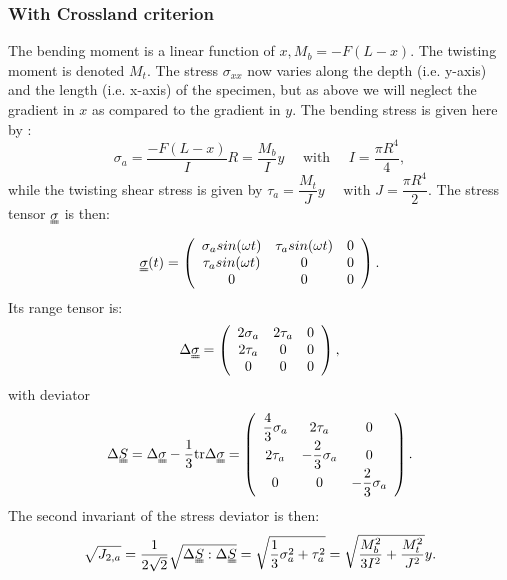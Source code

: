 \subsubsection{With Crossland criterion}
The bending moment is a linear function of $x, M_b= -F(L-x)$. The twisting moment is denoted $M_t$. The stress $\sigma_{xx}$ now varies along the depth (i.e. y-axis) and the length (i.e. x-axis) of the specimen, but as above we will neglect the gradient in $x$ as compared to the gradient in $y$. The bending stress is given here by : 
\begin{equation}
	\sigma_{a}=\dfrac{-F(L-x)}{I}R=\dfrac{M_b}{I}y \quad \text{ with } \quad I=\dfrac{\pi R^4}{4},
\end{equation}
while the twisting shear stress is given by 
$ \tau_{a}=\dfrac{M_t}{J}y \quad \text{ with  }
J=\dfrac{\pi R^4}{2}$. 
The stress tensor $\uuline{\sigma}$ is then:
\begin{equation} 
	\uuline{\sigma}(t)=
	\left(
	\begin{array}{ccc}
		\sigma_{a}sin(\omega t) & \tau_asin(\omega t) & 0\\
		\tau_asin(\omega t) & 0 & 0\\ 
		0 & 0 & 0\\
	\end{array}\right) .
\end{equation}
Its range tensor is:
\begin{equation} 
	\Delta\uuline{\sigma}=
	\left(
	\begin{array}{ccc}
		2\sigma_a& 2\tau_a & 0\\
		2\tau_a& 0 & 0\\ 
		0 & 0 & 0\\
	\end{array}\right) ,
\end{equation}
with deviator
\begin{equation} 
	\Delta\uuline{ S}=\Delta\uuline{\sigma}-\dfrac{1}{3}\textrm{tr}\Delta\uuline{\sigma}=
	\left(
	\begin{array}{ccc}
		\dfrac{4}{3}\sigma_{a} & 2\tau_a & 0\\
		2\tau_a & -\dfrac{2}{3}\sigma_a & 0\\ 
		0 & 0 & -\dfrac{2}{3}\sigma_a\\
	\end{array}\right) .
\end{equation}
The second invariant of the stress deviator is then:
\begin{equation}
	\sqrt{J_{2,a}}=\dfrac{1}{2\sqrt{2}}\sqrt{\Delta \uuline{S}:\Delta \uuline{S}}=\sqrt{\dfrac{1}{3}\sigma_a^2+\tau_a^2}=\sqrt{\dfrac{M_b^2}{3I^2}+\dfrac{M_t^2}{J^2}}y.
\end{equation}
